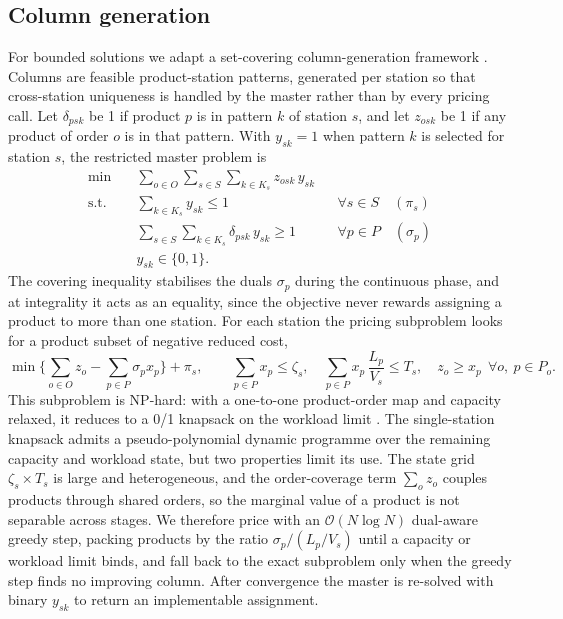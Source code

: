 \documentclass[]{interact}
\begin{document}
\subsection{Column generation}\label{sec:cg}
For bounded solutions we adapt a set-covering column-generation framework \citep{lubbecke2005selected, desrochers1989column}. Columns are feasible product-station patterns, generated per station so that cross-station uniqueness is handled by the master rather than by every pricing call. Let $\delta_{psk}$ be 1 if product $p$ is in pattern $k$ of station $s$, and let $z_{osk}$ be 1 if any product of order $o$ is in that pattern. With $y_{sk}=1$ when pattern $k$ is selected for station $s$, the restricted master problem is
\begin{align}
\min \quad & \sum_{o \in O}\sum_{s \in S}\sum_{k \in K_s} z_{osk}\,y_{sk}\\
\text{s.t.}\quad
& \sum_{k \in K_s} y_{sk} \le 1 && \forall s \in S \quad (\pi_s)\\
& \sum_{s \in S}\sum_{k \in K_s} \delta_{psk}\,y_{sk} \ge 1 && \forall p \in P \quad (\sigma_p)\\
& y_{sk} \in \{0,1\}.
\end{align}
The covering inequality stabilises the duals $\sigma_p$ during the continuous phase, and at integrality it acts as an equality, since the objective never rewards assigning a product to more than one station. For each station the pricing subproblem looks for a product subset of negative reduced cost,
\[
\min \Big\{ \sum_{o \in O} z_o - \sum_{p \in P} \sigma_p x_p \Big\} + \pi_s,
\qquad
\sum_{p \in P} x_p \le \zeta_s,\quad
\sum_{p \in P} x_p\,\frac{L_p}{V_s} \le T_s,\quad
z_o \ge x_p\ \ \forall o,\ p\in P_o.
\]
This subproblem is NP-hard: with a one-to-one product-order map and capacity relaxed, it reduces to a 0/1 knapsack on the workload limit \citep{garey1979computers}. The single-station knapsack admits a pseudo-polynomial dynamic programme over the remaining capacity and workload state, but two properties limit its use. The state grid $\zeta_s \times T_s$ is large and heterogeneous, and the order-coverage term $\sum_o z_o$ couples products through shared orders, so the marginal value of a product is not separable across stages. We therefore price with an $\mathcal{O}(N \log N)$ dual-aware greedy step, packing products by the ratio $\sigma_p/(L_p/V_s)$ until a capacity or workload limit binds, and fall back to the exact subproblem only when the greedy step finds no improving column. After convergence the master is re-solved with binary $y_{sk}$ to return an implementable assignment.
\end{document}
